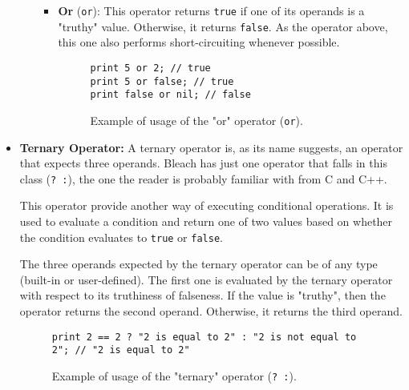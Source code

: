 \begin{itemize}
\begin{itemize}
\begin{itemize}
                    \item \textbf{Or} (\texttt{or}): This operator returns \texttt{true} if one of its operands is a "truthy" value. Otherwise, it returns \texttt{false}. As the operator above, this one also performs short-circuiting whenever possible.
                                        \begin{figure}[H]
                        \centering
                        \begin{lstlisting}
print 5 or 2; // true
print 5 or false; // true
print false or nil; // false
                        \end{lstlisting}
                        \caption{Example of usage of the "or" operator (\texttt{or}).}
                    \end{figure}
                \end{itemize}
        \end{itemize}
    \item \textbf{Ternary Operator:}
        A ternary operator is, as its name suggests, an operator that expects three operands. Bleach has just one operator that falls in this class (\texttt{? :}), the one the reader is probably familiar with from C and C++.
    
        This operator provide another way of executing conditional operations. It is used to evaluate a condition and return one of two values based on whether the condition evaluates to \texttt{true} or \texttt{false}.

        The three operands expected by the ternary operator can be of any type (built-in or user-defined). The first one is evaluated by the ternary operator with respect to its truthiness of falseness. If the value is "truthy", then the operator returns the second operand. Otherwise, it returns the third operand.

        \begin{figure}[H]
            \centering
            \begin{lstlisting}
print 2 == 2 ? "2 is equal to 2" : "2 is not equal to 2"; // "2 is equal to 2"
            \end{lstlisting}
            \caption{Example of usage of the "ternary" operator (\texttt{? :}).}
        \end{figure}


\end{itemize}
